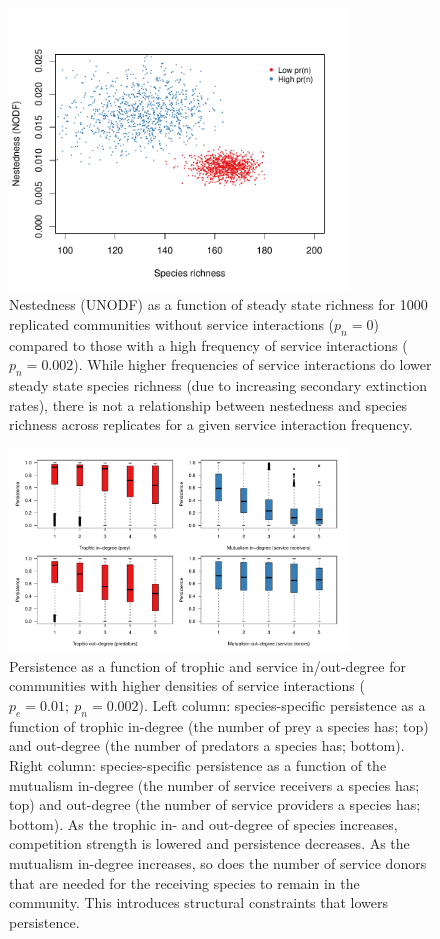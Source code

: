 \documentclass[twocolumn,preprintnumbers,amsmath,amssymb,superscriptaddress,linenumbers]{revtex4-1}
\begin{document}
\begin{figure}[h!]
\centering
\includegraphics[width=0.8\textwidth]{fig_nestedvsize.pdf}
\caption{
Nestedness (UNODF) as a function of steady state richness for 1000 replicated communities without service interactions ($p_n = 0$) compared to those with a high frequency of service interactions ($p_n = 0.002$).
While higher frequencies of service interactions do lower steady state species richness (due to increasing secondary extinction rates), there is not a relationship between nestedness and species richness across replicates for a given service interaction frequency.
}
\label{fig:nestsize}
\end{figure}




\begin{figure}[h!]
\centering
\includegraphics[width=0.8\textwidth]{fig_persistdegree_boxall.pdf}
\caption{
Persistence as a function of trophic and service in/out-degree for communities with higher densities of service interactions ($p_e = 0.01;~p_n = 0.002$).
Left column: species-specific persistence as a function of trophic in-degree (the number of prey a species has; top) and out-degree (the number of predators a species has; bottom).
Right column: species-specific persistence as a function of the mutualism in-degree (the number of service receivers a species has; top) and out-degree (the number of service providers a species has; bottom).
As the trophic in- and out-degree of species increases, competition strength is lowered and persistence decreases.
As the mutualism in-degree increases, so does the number of service donors that are needed for the receiving species to remain in the community. This introduces structural constraints that lowers persistence.
}
\label{fig:degree}
\end{figure}
\end{document}
